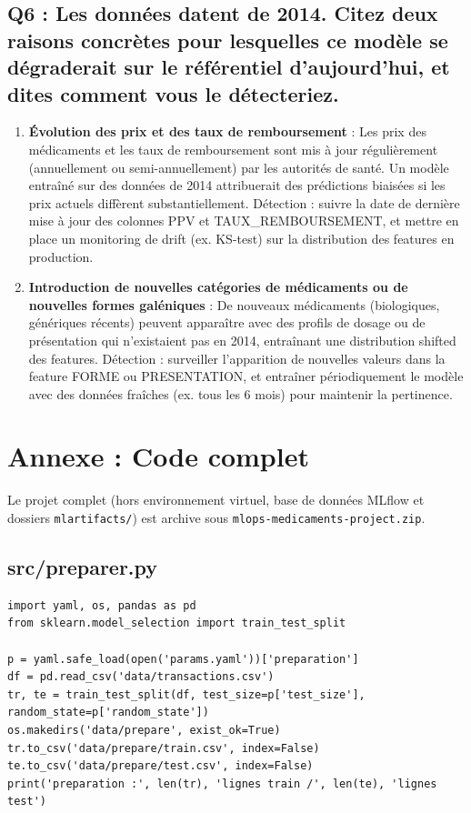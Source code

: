 \documentclass[12pt,a4paper]{report}
\begin{document}
\section{Q6 : Les données datent de 2014. Citez deux raisons concrètes pour lesquelles ce modèle se dégraderait sur le référentiel d'aujourd'hui, et dites comment vous le détecteriez.}
\begin{enumerate}
    \item \textbf{Évolution des prix et des taux de remboursement} : Les prix des médicaments et les taux de remboursement sont mis à jour régulièrement (annuellement ou semi-annuellement) par les autorités de santé. Un modèle entraîné sur des données de 2014 attribuerait des prédictions biaisées si les prix actuels diffèrent substantiellement. Détection : suivre la date de dernière mise à jour des colonnes PPV et TAUX\_REMBOURSEMENT, et mettre en place un monitoring de drift (ex. KS-test) sur la distribution des features en production.
    \item \textbf{Introduction de nouvelles catégories de médicaments ou de nouvelles formes galéniques} : De nouveaux médicaments (biologiques, génériques récents) peuvent apparaître avec des profils de dosage ou de présentation qui n'existaient pas en 2014, entraînant une distribution shifted des features. Détection : surveiller l'apparition de nouvelles valeurs dans la feature FORME ou PRESENTATION, et entraîner périodiquement le modèle avec des données fraîches (ex. tous les 6 mois) pour maintenir la pertinence.
\end{enumerate}

\chapter*{Annexe : Code complet}

Le projet complet (hors environnement virtuel, base de données MLflow et dossiers \texttt{mlartifacts/}) est archive sous \texttt{mlops-medicaments-project.zip}.

\section{src/preparer.py}
\begin{verbatim}
import yaml, os, pandas as pd
from sklearn.model_selection import train_test_split

p = yaml.safe_load(open('params.yaml'))['preparation']
df = pd.read_csv('data/transactions.csv')
tr, te = train_test_split(df, test_size=p['test_size'], random_state=p['random_state'])
os.makedirs('data/prepare', exist_ok=True)
tr.to_csv('data/prepare/train.csv', index=False)
te.to_csv('data/prepare/test.csv', index=False)
print('preparation :', len(tr), 'lignes train /', len(te), 'lignes test')
\end{verbatim}
\end{document}
